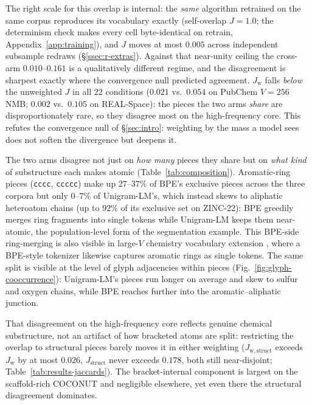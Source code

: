 \documentclass{article}
\begin{document}
The right scale for this overlap is internal:
the \emph{same} algorithm retrained on the same corpus reproduces its vocabulary
exactly (self-overlap $J{=}1.0$; the determinism check makes every cell
byte-identical on retrain, Appendix~\ref{app:training}), and $J$ moves at most
$0.005$ across independent subsample redraws (\S\ref{ssec:r-extras}). Against that
near-unity ceiling the cross-arm $0.010$--$0.161$ is a qualitatively different
regime, and the disagreement is sharpest exactly where the convergence null
predicted agreement. $J_{\mathrm{w}}$ falls \emph{below} the unweighted $J$ in all $22$
conditions ($0.021$ vs.\ $0.054$ on PubChem $V{=}256$ NMB; $0.002$ vs.\
$0.105$ on REAL-Space): the pieces the two arms \emph{share} are
disproportionately rare, so they disagree most on the high-frequency core. This
refutes the convergence null of \S\ref{sec:intro}: weighting by
the mass a model sees does not soften the divergence but deepens it.

The two arms disagree not just on \emph{how many} pieces they share but on
\emph{what kind} of substructure each makes atomic
(Table~\ref{tab:composition}). Aromatic-ring
pieces (\texttt{cccc}, \texttt{ccccc}) make up $27$--$37\%$ of BPE's exclusive
pieces across the three corpora but only $0$--$7\%$ of Unigram-LM's, which
instead skews to aliphatic heteroatom chains (up to $92\%$ of its exclusive set
on ZINC-22): BPE greedily merges ring fragments into single tokens while
Unigram-LM keeps them near-atomic, the population-level form of the segmentation
example. This BPE-side ring-merging is also visible in large-$V$ chemistry
vocabulary extension \citep{kalamkar2025tokenization}, where a BPE-style
tokenizer likewise captures aromatic rings as single tokens. The same split is visible
at the level of glyph adjacencies within pieces
(Fig.~\ref{fig:glyph-cooccurrence}): Unigram-LM's pieces run longer on average and
skew to sulfur and oxygen chains, while BPE reaches further into the
aromatic--aliphatic junction.

That disagreement on the high-frequency core reflects genuine chemical
substructure, not an artifact of how bracketed atoms are split: restricting the overlap to structural pieces
barely moves it in either weighting ($J_{\mathrm{w,struct}}$ exceeds
$J_{\mathrm{w}}$ by at most $0.026$, $J_{\mathrm{struct}}$ never exceeds $0.178$,
both still near-disjoint; Table~\ref{tab:results-jaccards}). The
bracket-internal component is largest on the scaffold-rich COCONUT and negligible
elsewhere, yet even there the structural disagreement dominates.
\end{document}
